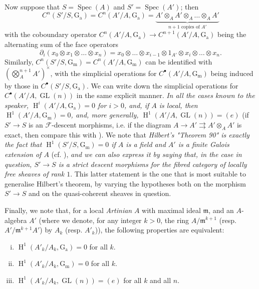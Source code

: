 Now suppose that $S=\operatorname{Spec}(A)$ and $S'=\operatorname{Spec}(A')$;
then
\[
    C^n(S'/S,\operatorname{G_a})
    = C^n(A'/A,\operatorname{G_a})
    = \underbrace{A'\otimes_A A'\otimes_A\ldots\otimes_A A'}_{n+1\text{ copies of }A'}
\]
with the coboundary operator $C^n(A'/A,\operatorname{G_a})\to C^{n+1}(A'/A,\operatorname{G_a})$ being the alternating sum of the face operators
\[
    \partial_i(x_0\otimes x_1\otimes\ldots\otimes x_n)
    = x_0\otimes\ldots\otimes x_{i-1}\otimes1_{A'}\otimes x_i\otimes\ldots\otimes x_n.
\]
Similarly, $C^n(S'/S,\operatorname{G_m})=C^n(A'/A,\operatorname{G_m})$ can be identified with $(\bigotimes_A^{n+1}A')^\times$, with the simplicial operations for $C^\bullet(A'/A,\operatorname{G_m})$ being induced by those in $C^\bullet(S'/S,\operatorname{G_a})$.
We can write down the simplicial operations for $C^\bullet(A'/A,\operatorname{GL}(n))$ in the same explicit manner.
\emph{In all the cases known to the speaker, $\operatorname{H}^i(A'/A,\operatorname{G_a})=0$ for $i>0$, and, if $A$ is local, then $\operatorname{H}^1(A'/A,\operatorname{G_m})=0$, and, more generally, $\operatorname{H}^1(A'/A,\operatorname{GL}(n))=(e)$} (if $S'\to S$ is an $\mathcal{F}$-descent morphisms, i.e. if the diagram $A\to A'\rightrightarrows A'\otimes_A A'$ is exact, then compare this with ).
We note that \emph{Hilbert's "Theorem 90" is exactly the fact that $\operatorname{H}^1(S'/S,\operatorname{G_m})=0$ if $A$ is a field and $A'$ is a finite Galois extension of $A$} (cf. ), \emph{and we can also express it by saying that, in the case in question, $S'\to S$ is a strict descent morphisms for the fibred category of locally free sheaves of rank $1$}.
This latter statement is the one that is most suitable to generalise Hilbert's theorem, by varying the hypotheses both on the morphism $S'\to S$ and on the quasi-coherent sheaves in question.

Finally, we note that, for a local \emph{Artinian} $A$ with maximal ideal $\mathfrak{m}$, and an $A$-algebra $A'$ (where we denote, for any integer $k>0$, the ring $A/\mathfrak{m}^{k+1}$ (resp. $A'/\mathfrak{m}^{k+1}A'$) by $A_k$ (resp. $A'_k$)), the following properties are equivalent:

\begin{enumerate}[i.]
    \item  $\operatorname{H}^1(A'_k/A_k,\operatorname{G_a})=0$ for all $k$.
    \item $\operatorname{H}^1(A'_k/A_k,\operatorname{G_m})=0$ for all $k$.
    \item $\operatorname{H}^1(A'_k/A_k,\operatorname{GL}(n))=(e)$ for all $k$ and all $n$.
\end{enumerate}

